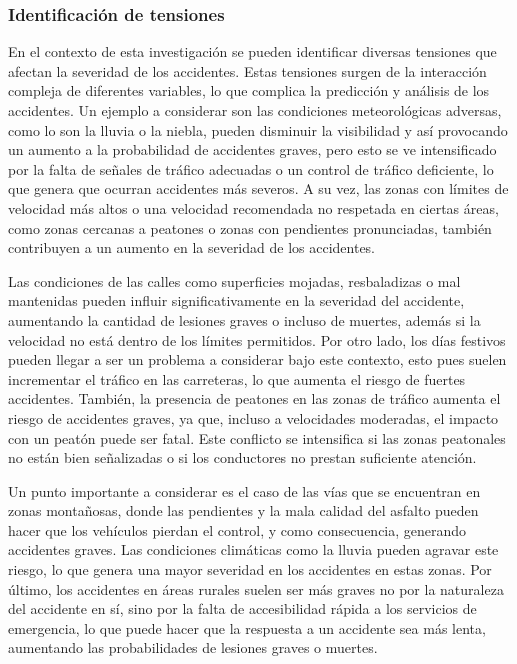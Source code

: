 \documentclass{book}
\begin{document}
\subsubsection{Identificación de tensiones}

En el contexto de esta investigación se pueden identificar diversas tensiones que afectan la severidad de los accidentes. Estas tensiones surgen de la interacción compleja de diferentes variables, lo que complica la predicción y análisis de los accidentes. Un ejemplo a considerar son las condiciones meteorológicas adversas, como lo son la lluvia o la niebla, pueden disminuir la visibilidad y así provocando un aumento a la probabilidad de accidentes graves, pero esto se ve intensificado por la falta de señales de tráfico adecuadas o un control de tráfico deficiente, lo que genera que ocurran accidentes más severos. A su vez, las zonas con límites de velocidad más altos o una velocidad recomendada no respetada en ciertas áreas, como zonas cercanas a peatones o zonas con pendientes pronunciadas, también contribuyen a un aumento en la severidad de los accidentes.

Las condiciones de las calles como superficies mojadas, resbaladizas o mal mantenidas pueden influir significativamente en la severidad del accidente, aumentando la cantidad de lesiones graves o incluso de muertes, además si la velocidad no está dentro de los límites permitidos. Por otro lado, los días festivos pueden llegar a ser un problema a considerar bajo este contexto, esto pues suelen incrementar el tráfico en las carreteras, lo que aumenta el riesgo de fuertes accidentes. También, la presencia de peatones en las zonas de tráfico aumenta el riesgo de accidentes graves, ya que, incluso a velocidades moderadas, el impacto con un peatón puede ser fatal. Este conflicto se intensifica si las zonas peatonales no están bien señalizadas o si los conductores no prestan suficiente atención.

Un punto importante a considerar es el caso de las vías que se encuentran en zonas montañosas, donde las pendientes y la mala calidad del asfalto pueden hacer que los vehículos pierdan el control, y como consecuencia, generando accidentes graves. Las condiciones climáticas como la lluvia pueden agravar este riesgo, lo que genera una mayor severidad en los accidentes en estas zonas. Por último, los accidentes en áreas rurales suelen ser más graves no por la naturaleza del accidente en sí, sino por la falta de accesibilidad rápida a los servicios de emergencia, lo que puede hacer que la respuesta a un accidente sea más lenta, aumentando las probabilidades de lesiones graves o muertes.
\end{document}
